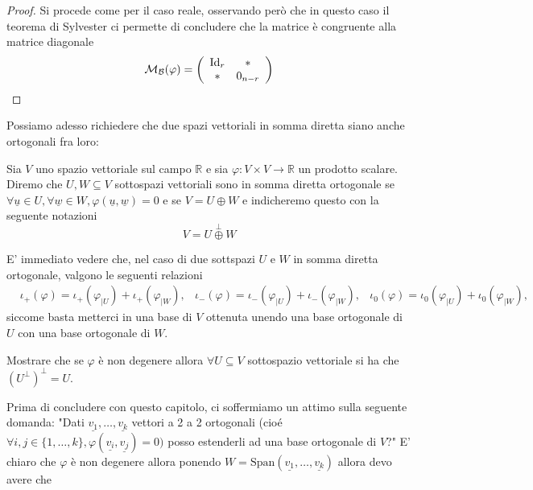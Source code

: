 \begin{proof}
	Si procede come per il caso reale, osservando però che in questo caso il teorema di Sylvester ci permette di concludere che la matrice è congruente alla matrice diagonale
	\begin{align}
		\mathcal{M}_\mathcal{B}(\varphi) = \left( \begin{array}{c c}
			\text{Id}_r & * \\
			* & 0_{n-r}
		\end{array} \right)
	\end{align}
\end{proof}
Possiamo adesso richiedere che due spazi vettoriali in somma diretta siano anche ortogonali fra loro:
\begin{definition}
	Sia $V$ uno spazio vettoriale sul campo $\mathbb{R}$ e sia $\varphi: V \times V \to \mathbb{R}$ un prodotto scalare. Diremo che $U, W \subseteq V$ sottospazi vettoriali sono in somma diretta ortogonale se $\forall \underline{u} \in U, \forall \underline{w} \in W, \varphi(\underline{u}, \underline{w}) = 0$ e se $V = U \oplus W$ e indicheremo questo con la seguente notazioni
	$$
		V = U \overset{\perp}{\oplus} W
	$$
\end{definition}
\begin{remark}
	E' immediato vedere che, nel caso di due sottspazi $U$ e $W$ in somma diretta ortogonale, valgono le seguenti relazioni
	\begin{align}
		&\iota_+(\varphi) = \iota_+(\varphi_{|U}) + \iota_+(\varphi_{|W}),
		&\iota_-(\varphi) = \iota_-(\varphi_{|U}) + \iota_-(\varphi_{|W}),
		&\iota_0(\varphi) = \iota_0(\varphi_{|U}) + \iota_0(\varphi_{|W}),
	\end{align}
	siccome basta metterci in una base di $V$ ottenuta unendo una base ortogonale di $U$ con una base ortogonale di $W$.
\end{remark}
\begin{exercise}
	Mostrare che se $\varphi$ è non degenere allora $\forall U \subseteq V$ sottospazio vettoriale si ha che $(U^\perp)^\perp = U$.
\end{exercise}
Prima di concludere con questo capitolo, ci soffermiamo un attimo sulla seguente domanda: "Dati $\underline{v_1}, \ldots, \underline{v_k}$ vettori a 2 a 2 ortogonali (cioé $\forall i, j \in \{ 1, \ldots, k\}, \varphi(\underline{v_i}, \underline{v_j}) = 0)$ posso estenderli ad una base ortogonale di $V$?" E' chiaro che $\varphi$ è non degenere allora ponendo $W = \text{Span}(\underline{v_1}, \ldots, \underline{v_k})$ allora devo avere che
